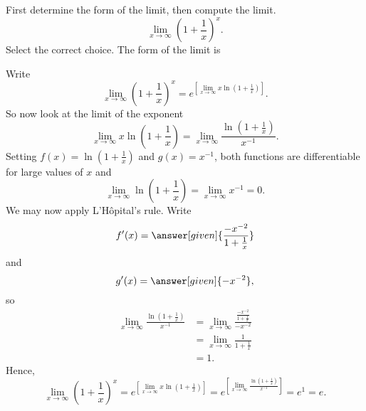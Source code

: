 \documentclass{ximera}
\begin{document}
\begin{example}
First determine the form of the limit, then compute the limit.
\[
\lim_{x\to \infty}\left(1 + \frac{1}{x}\right)^x.
\]
  Select the correct choice. The form of the limit is
 \begin{multipleChoice}
     \choice{$\zeroOverZero$}
 \choice{ \inftyOverInfty}
 \choice{$\zeroTimesInfty$}
 \choice{ \inftyMinusInfty}
  \choice[correct] {$\oneToInfty$}
   \choice{$ \inftyToZero$}
   \choice{$\zeroToZero$}
  \end{multipleChoice}
\begin{explanation}
Write
\[
\lim_{x\to \infty}\left(1 + \frac{1}{x}\right)^x = e^{\left[\lim_{x\to \infty}x\ln\left(1 + \frac{1}{x}\right)\right]}.
\]
So now look at the limit of the exponent
\[
\lim_{x\to\infty} x\ln\left(1 + \frac{1}{x}\right) = \lim_{x\to\infty} \frac{\ln\left(1 + \frac{1}{x}\right)}{x^{-1}}.
\]
Setting $f(x) = \ln\left(1 + \frac{1}{x}\right)$ and $g(x) = x^{-1}$,
both functions are differentiable for large values of $x$ and
\[
\lim_{x\to \infty}\ln\left(1 + \frac{1}{x}\right)=\lim_{x\to \infty}x^{-1} = 0.
\]
We may now apply L'H\^{o}pital's rule. Write
\[
f'(x) = \answer[given]{\frac{-x^{-2}}{1 + \frac{1}{x}}}
\]
and
\[
g'(x) = \answer[given]{-x^{-2}},
\]
so
\begin{align*}
\lim_{x\to\infty} \frac{\ln\left(1 + \frac{1}{x}\right)}{x^{-1}} &= \lim_{x\to\infty} \frac{\frac{-x^{-2}}{1 + \frac{1}{x}}}{-x^{-2}} \\
&=\lim_{x\to\infty} \frac{1}{1 + \frac{1}{x}}\\
&=1.
\end{align*}
Hence, 
\[
\lim_{x\to \infty}\left(1 + \frac{1}{x}\right)^x =e^{ \left[\lim_{x\to \infty}x\ln\left(1 + \frac{1}{x}\right)\right]} =e^{ \left[\lim_{x\to\infty} \frac{\ln\left(1 + \frac{1}{x}\right)}{x^{-1}}\right]} =e^{1} = e.
\]
\end{explanation}
\end{example}
\end{document}
